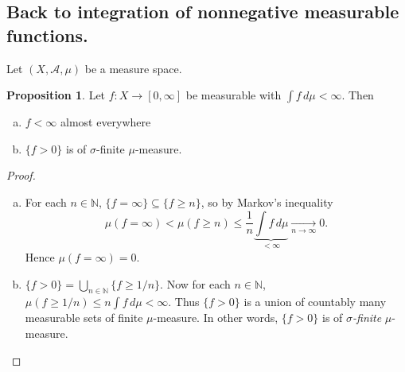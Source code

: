 \documentclass{article}
\newcommand{\N}{\mathbb{N}}
\theoremstyle{definition}
\newtheorem{proposition}[theorem]{Proposition}
\begin{document}
\subsection*{Back to integration of nonnegative measurable functions.}

Let $(X, \mathscr{A}, \mu)$ be a measure space.

\begin{proposition}
Let $f:X \longrightarrow [0, \infty]$ be measurable with $\int f\,d\mu < \infty$. Then
\begin{enumerate}[(a)]
    \item $f < \infty$ almost everywhere
    \item $\{f > 0\}$ is of $\sigma$-finite $\mu$-measure.
\end{enumerate}
\end{proposition}
\begin{proof}
    \begin{enumerate}[(a)]
        \item For each $n \in \N$, $\{f = \infty\} \subseteq \{f \geq n\}$, so by Markov's inequality
        \[
            \mu(f = \infty) < \mu(f \geq n) \leq \frac{1}{n}\underbrace{\int f\,d\mu}_{< \infty} \xrightarrow[n\to\infty]{} 0.
        \]
        Hence $\mu(f = \infty) = 0$.
        \item $\{f > 0\} = \bigcup_{n \in \N} \{f \geq 1/n\}$. Now for each $n \in \N$, $\mu(f \geq 1/n) \leq n\int f\,d\mu < \infty$. Thus $\{f > 0\}$ is a union of countably many measurable sets of finite $\mu$-measure. In other words, $\{f > 0\}$ is of \emph{$\sigma$-finite} $\mu$-measure.
    \end{enumerate}
\end{proof}
\end{document}
